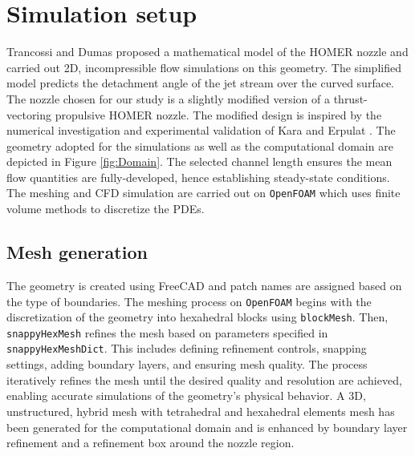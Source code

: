 \section{Simulation setup}
Trancossi and Dumas \cite{trandum} proposed a mathematical model of the HOMER nozzle and carried out 2D, incompressible flow simulations on this geometry. The simplified model predicts the detachment angle of the jet stream over the curved surface. The nozzle chosen for our study is a slightly modified version of a thrust-vectoring propulsive HOMER nozzle. The modified design is inspired by the numerical investigation and experimental validation of Kara and Erpulat \cite{kara}. The geometry adopted for the simulations as well as the computational domain are depicted in Figure \ref{fig:Domain}. The selected channel length ensures the mean flow quantities are fully-developed, hence establishing steady-state conditions. The meshing and CFD simulation are carried out on \verb|OpenFOAM| which uses finite volume methods to discretize the PDEs. 
\subsection{Mesh generation}
The geometry is created using FreeCAD and patch names are assigned based on the type of boundaries.  The meshing process on \verb|OpenFOAM| begins with the discretization of the geometry into hexahedral blocks using \verb|blockMesh|. Then, \verb|snappyHexMesh| refines the mesh based on parameters specified in \verb|snappyHexMeshDict|. This includes defining refinement controls, snapping settings, adding boundary layers, and ensuring mesh quality. The process iteratively refines the mesh until the desired quality and resolution are achieved, enabling accurate simulations of the geometry's physical behavior. A 3D, unstructured, hybrid mesh with tetrahedral and hexahedral elements mesh has been generated for the computational domain and is enhanced by boundary layer refinement and a refinement box around the nozzle region.
